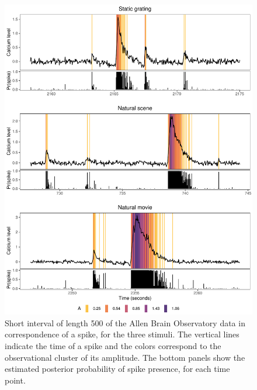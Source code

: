 \begin{figure}
	\centerline{\includegraphics[width = .75\linewidth]{_Images/ch3_spike_color_prob_new.pdf}}
	\caption[Visual representation of the estimated spikes and their amplitudes in the calcium trace from the Allen Brain Observatory data.]{Short interval of length 500 of the Allen Brain Observatory data in correspondence of a spike, for the three stimuli. The vertical lines indicate the time of a spike and the colors correspond to the observational cluster of its amplitude. The bottom panels show the estimated posterior probability of spike presence, for each time point.}
	\label{fig:spike_color}
\end{figure}


















